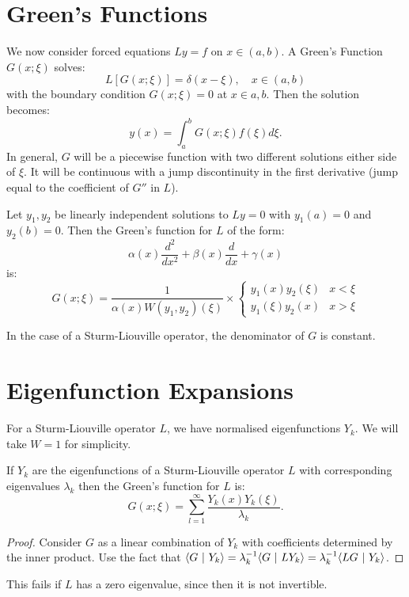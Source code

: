 \documentclass[../Main.tex]{subfiles}
\begin{document}
\section{Green's Functions}
We now consider forced equations $Ly = f$ on $x \in (a, b)$. A Green's Function $G(x;\xi)$ solves:
\begin{equation*}
    L[G(x;\xi)] = \delta(x - \xi),\quad x \in (a, b)
\end{equation*}
with the boundary condition $G(x;\xi) = 0$ at $x \in {a, b}$. Then the solution becomes:
\begin{equation*}
    y(x) = \int_{a}^{b} G(x;\xi)f(\xi) d\xi.
\end{equation*}
In general, $G$ will be a piecewise function with two different solutions either side of $\xi$. It will be continuous with a jump discontinuity in the first derivative (jump equal to the coefficient of $G''$ in $L$).
\begin{proposition}
    Let $y_1, y_2$ be linearly independent solutions to $Ly = 0$ with $y_1(a) = 0$ and $y_2(b) = 0$. Then the Green's function for $L$ of the form:
    \begin{equation*}
        \alpha(x) \frac{d^{2}}{dx^{2}} + \beta(x) \frac{d}{dx} + \gamma(x)
    \end{equation*}
    is:
    \begin{equation*}
        G(x;\xi) = \frac{1}{\alpha(x) W(y_1, y_2)(\xi)} \times
        \begin{cases}
            y_1(x) y_2(\xi) & x < \xi \\
            y_1(\xi) y_2(x) & x > \xi
        \end{cases}
    \end{equation*}
    \label{propGreenFunc}
\end{proposition}
In the case of a Sturm-Liouville operator, the denominator of $G$ is constant.
\section{Eigenfunction Expansions}
For a Sturm-Liouville operator $L$, we have normalised eigenfunctions $Y_k$. We will take $W = 1$ for simplicity.
\begin{proposition}
    If $Y_k$ are the eigenfunctions of a Sturm-Liouville operator $L$ with corresponding eigenvalues $\lambda_k$ then the Green's function for $L$ is:
    \begin{equation*}
        G(x;\xi) = \sum_{l=1}^{\infty} \frac{Y_k(x)Y_k(\xi)}{\lambda_k}.
    \end{equation*}
    \label{propGreensExpansion}
\end{proposition}
\begin{proof}
    Consider $G$ as a linear combination of $Y_k$ with coefficients determined by the inner product. Use the fact that $\langle G~\vert~Y_k\rangle = \lambda_k^{-1} \langle G~\vert~LY_k\rangle = \lambda_k^{-1} \langle LG~\vert~Y_k\rangle$.
\end{proof}
This fails if $L$ has a zero eigenvalue, since then it is not invertible.
\end{document}
